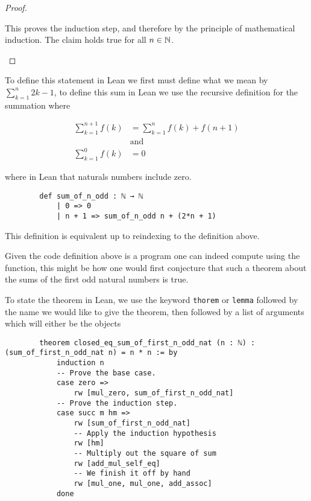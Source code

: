 \begin{example}
\begin{proof}
\begin{itemize}
            This proves the induction step, and therefore by the principle of mathematical induction. The claim holds true for all $n \in \mathbb{N}$.
        \end{itemize}
    \end{proof}

    To define this statement in Lean we first must define what we mean by $\sum_{k = 1}^{n} 2k - 1$, to define this sum in Lean we use the recursive definition
    for the summation where 

    \begin{align*}
        \sum_{k = 1}^{n + 1} f(k) &= \sum_{k = 1}^{n} f(k) + f(n + 1) \tag{for $n \geq 0$}\\
            &\text{and}\\
        \sum_{k = 1}^{0} f(k) &= 0
    \end{align*}

    where in Lean that naturals numbers include zero.

    \begin{verbatim}
        def sum_of_n_odd : ℕ → ℕ
            | 0 => 0
            | n + 1 => sum_of_n_odd n + (2*n + 1)
    \end{verbatim}

    This definition is equivalent up to reindexing to the definition above.

    Given the code definition above is a program one can indeed compute using the
    function, this might be how one would first conjecture that such a theorem about 
    the sums of the first odd natural numbers is true.

    To state the theorem in Lean, we use the keyword \texttt{thorem} or \texttt{lemma}
    followed by the name we would like to give the theorem, then followed by a list of arguments
    which will either be the objects 

    \begin{verbatim}
        theorem closed_eq_sum_of_first_n_odd_nat (n : ℕ) : (sum_of_first_n_odd_nat n) = n * n := by
            induction n
            -- Prove the base case.
            case zero =>
                rw [mul_zero, sum_of_first_n_odd_nat]
            -- Prove the induction step.
            case succ m hm =>
                rw [sum_of_first_n_odd_nat]
                -- Apply the induction hypothesis
                rw [hm]
                -- Multiply out the square of sum
                rw [add_mul_self_eq]
                -- We finish it off by hand
                rw [mul_one, mul_one, add_assoc]
            done
    \end{verbatim}
\end{example}






